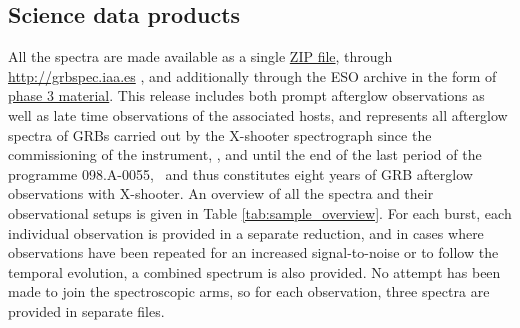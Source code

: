 \documentclass[longauth]{aa}    %
\begin{document}
                                                                                           




\subsection{Science data products} \label{products}


All the spectra are made available as a single
\href{https://sid.erda.dk/cgi-sid/ls.py?share_id=DBuNORk1lI}{ZIP file}, through
\url{http://grbspec.iaa.es} \citep{DeUgartePostigo2014f}, and additionally through the ESO archive in the
form of \href{http://archive.eso.org/wdb/wdb/adp/phase3_main/form}{phase 3
	material}. This release includes both prompt afterglow observations as well as
late time observations of the associated hosts, and represents all
afterglow spectra of GRBs carried out by the X-shooter spectrograph since the
commissioning of the instrument, \startdate, and until the end of the last
period of the programme 098.A-0055, \termdate~and thus constitutes eight years of GRB
afterglow observations with X-shooter. An overview of all the spectra and their
observational setups is given in Table \ref{tab:sample_overview}. For each
burst, each individual observation is provided in a separate reduction, and in
cases where observations have been repeated for an increased signal-to-noise or
to follow the temporal evolution, a combined spectrum is also provided. No
attempt has been made to join the spectroscopic arms, so for each observation,
three spectra are provided in separate files.
\end{document}

